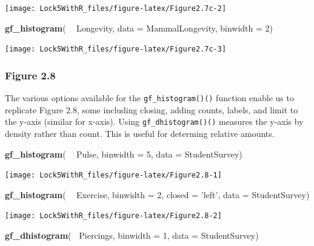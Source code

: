 \documentclass[]{book}
\newenvironment{Shaded}{\begin{snugshade}}{\end{snugshade}}
\newcommand{\DataTypeTok}[1]{\textcolor[rgb]{0.13,0.29,0.53}{#1}}
\newcommand{\DecValTok}[1]{\textcolor[rgb]{0.00,0.00,0.81}{#1}}
\newcommand{\KeywordTok}[1]{\textcolor[rgb]{0.13,0.29,0.53}{\textbf{#1}}}
\newcommand{\NormalTok}[1]{#1}
\newcommand{\OperatorTok}[1]{\textcolor[rgb]{0.81,0.36,0.00}{\textbf{#1}}}
\newcommand{\StringTok}[1]{\textcolor[rgb]{0.31,0.60,0.02}{#1}}
\begin{document}
\texttt{[image: Lock5WithR\_files/figure-latex/Figure2.7c-2]}

\begin{Shaded}
\begin{Highlighting}[]
\KeywordTok{gf_histogram}\NormalTok{( }\OperatorTok{~}\StringTok{ }\NormalTok{Longevity, }\DataTypeTok{data =}\NormalTok{ MammalLongevity, }\DataTypeTok{binwidth =} \DecValTok{2}\NormalTok{)}
\end{Highlighting}
\end{Shaded}

\texttt{[image: Lock5WithR\_files/figure-latex/Figure2.7c-3]}

\hypertarget{figure-2.8}{%
\subsubsection{Figure 2.8}\label{figure-2.8}}

The various options available for the \texttt{gf\_histogram()()} function enable us to replicate Figure 2.8, some including closing, adding counts, labels, and limit to the y-axis (similar for x-axis). Using \texttt{gf\_dhistogram()()} measures the y-axis by density rather than count. This is useful for determing relative amounts.

\begin{Shaded}
\begin{Highlighting}[]
\KeywordTok{gf_histogram}\NormalTok{( }\OperatorTok{~}\StringTok{ }\NormalTok{Pulse, }\DataTypeTok{binwidth =} \DecValTok{5}\NormalTok{, }\DataTypeTok{data =}\NormalTok{ StudentSurvey)}
\end{Highlighting}
\end{Shaded}

\texttt{[image: Lock5WithR\_files/figure-latex/Figure2.8-1]}

\begin{Shaded}
\begin{Highlighting}[]
\KeywordTok{gf_histogram}\NormalTok{( }\OperatorTok{~}\StringTok{ }\NormalTok{Exercise, }\DataTypeTok{binwidth =} \DecValTok{2}\NormalTok{, }\DataTypeTok{closed =} \StringTok{'left'}\NormalTok{,}
              \DataTypeTok{data =}\NormalTok{ StudentSurvey)}
\end{Highlighting}
\end{Shaded}

\texttt{[image: Lock5WithR\_files/figure-latex/Figure2.8-2]}

\begin{Shaded}
\begin{Highlighting}[]
\KeywordTok{gf_dhistogram}\NormalTok{( }\OperatorTok{~}\NormalTok{Piercings, }\DataTypeTok{binwidth =} \DecValTok{1}\NormalTok{, }\DataTypeTok{data =}\NormalTok{ StudentSurvey)}
\end{Highlighting}
\end{Shaded}
\end{document}
